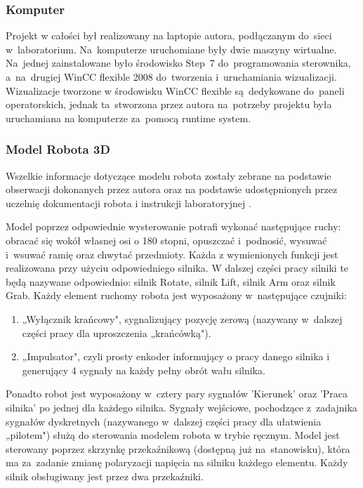 \subsubsection{Komputer}
Projekt w całości był realizowany na laptopie autora, podłączanym do~sieci w~laboratorium. Na~komputerze uruchomiane były dwie maszyny wirtualne. Na~jednej zainstalowane było środowisko Step~7 do~programowania sterownika, a~na~drugiej WinCC flexible 2008 do~tworzenia i~uruchamiania wizualizacji. Wizualizacje tworzone w środowisku WinCC flexible są~dedykowane do~paneli operatorskich, jednak ta~stworzona przez autora na~potrzeby projektu była uruchamiana na komputerze za~pomocą runtime system.

\subsubsection{Model Robota 3D}
Wszelkie informacje dotyczące modelu robota zostały zebrane na podstawie obserwacji dokonanych przez autora oraz na podstawie udostępnionych przez uczelnię dokumentacji robota i instrukcji laboratoryjnej \cite{robot1,robot2}.

Model poprzez odpowiednie wysterowanie potrafi wykonać następujące ruchy: obracać się wokół własnej osi o 180 stopni, opuszczać i~podnosić, wysuwać i~wsuwać ramię oraz chwytać przedmioty. Każda z wymienionych funkcji jest realizowana przy użyciu odpowiedniego silnika. W dalszej części pracy silniki te będą nazywane odpowiednio: silnik Rotate, silnik Lift, silnik Arm oraz silnik Grab. Każdy element ruchomy robota jest wyposażony w~następujące czujniki:
\vspace*{-1mm}
\begin{enumerate}
\item „Wyłącznik krańcowy", sygnalizujący pozycję zerową (nazywany w~dalszej części pracy dla uproszczenia „krańcówką"). 
\vspace*{-1mm}
\item „Impulsator", czyli prosty enkoder informujący o pracy danego silnika i generujący 4 sygnały na każdy pełny obrót wału silnika.
\end{enumerate}
\vspace*{-1mm}
\indent
\indent Ponadto robot jest wyposażony w~cztery pary sygnałów 'Kierunek' oraz 'Praca silnika' po jednej dla każdego silnika. Sygnały wejściowe, pochodzące z~zadajnika sygnałów dyskretnych (nazywanego w~dalszej części pracy dla ułatwienia „pilotem") służą do sterowania modelem robota w trybie ręcznym. Model jest sterowany poprzez skrzynkę przekaźnikową (dostępną już na~stanowisku), która ma za~zadanie zmianę polaryzacji napięcia na silniku każdego elementu. Każdy silnik obsługiwany jest przez dwa przekaźniki.

